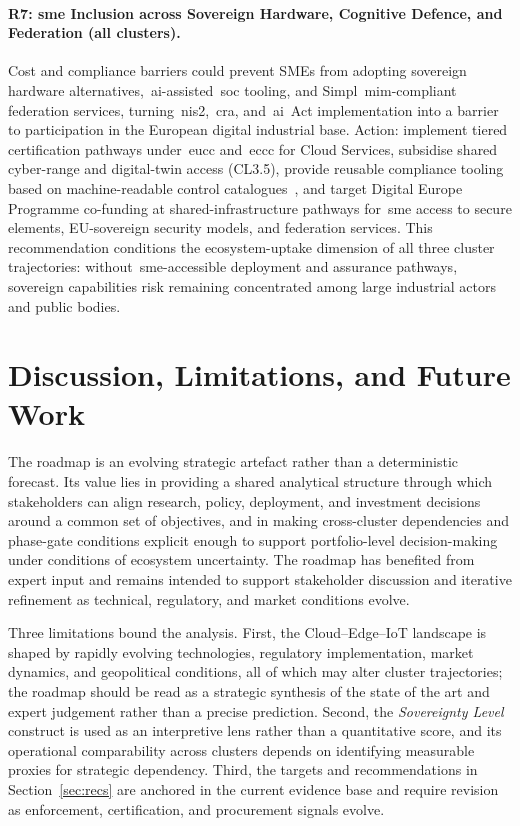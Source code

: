 \documentclass{ieeeaccess}
\begin{document}
\paragraph{R7: \acrshort{sme} Inclusion across Sovereign Hardware, Cognitive Defence, and Federation (all clusters).}
Cost and compliance barriers could prevent SMEs from adopting sovereign hardware alternatives,~\gls{ai}-assisted~\gls{soc} tooling, and Simpl~\gls{mim}-compliant federation services, turning~\gls{nis2},~\gls{cra}, and~\gls{ai}~Act implementation into a barrier to participation in the European digital industrial base. Action: implement tiered certification pathways under~\gls{eucc} and~\gls{eccc} for Cloud Services, subsidise shared cyber-range and digital-twin access (CL3.5), provide reusable compliance tooling based on machine-readable control catalogues~\cite{oscal2024,iorga2024oscal}, and target Digital Europe Programme co-funding at shared-infrastructure pathways for~\gls{sme} access to secure elements, EU-sovereign security models, and federation services. This recommendation conditions the ecosystem-uptake dimension of all three cluster trajectories: without~\acrshort{sme}-accessible deployment and assurance pathways, sovereign capabilities risk remaining concentrated among large industrial actors and public bodies.

\section{Discussion, Limitations, and Future Work}
\label{sec:disc}

The roadmap is an evolving strategic artefact rather than a deterministic forecast. Its value lies in providing a shared analytical structure through which stakeholders can align research, policy, deployment, and investment decisions around a common set of objectives, and in making cross-cluster dependencies and phase-gate conditions explicit enough to support portfolio-level decision-making under conditions of ecosystem uncertainty. The roadmap has benefited from expert input and remains intended to support stakeholder discussion and iterative refinement as technical, regulatory, and market conditions evolve.

Three limitations bound the analysis. First, the Cloud--Edge--IoT landscape is shaped by rapidly evolving technologies, regulatory implementation, market dynamics, and geopolitical conditions, all of which may alter cluster trajectories; the roadmap should be read as a strategic synthesis of the state of the art and expert judgement rather than a precise prediction. Second, the \emph{Sovereignty Level} construct is used as an interpretive lens rather than a quantitative score, and its operational comparability across clusters depends on identifying measurable proxies for strategic dependency. Third, the targets and recommendations in Section~\ref{sec:recs} are anchored in the current evidence base and require revision as enforcement, certification, and procurement signals evolve.
\end{document}
